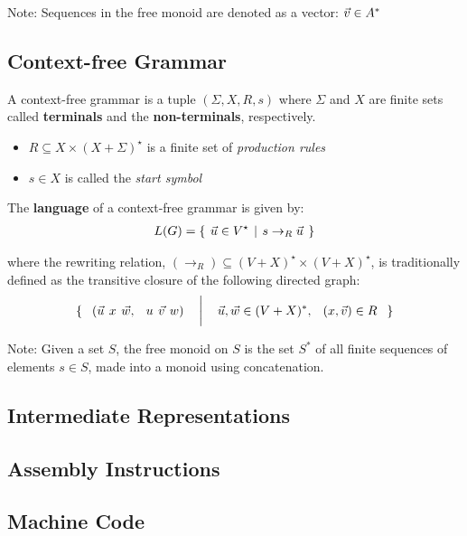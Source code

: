 Note: Sequences in the free monoid are denoted as a vector: $\large{\vec{v} \in A^{\ast}}$

\subsection{Context-free Grammar}
A context-free grammar is a tuple $(\Sigma, X, R, s)$ where $\Sigma$ and $X$ are finite sets called \textbf{terminals} 
and the \textbf{non-terminals}, respectively.

\begin{itemize}
    \item $R \subseteq X \times (X + \Sigma)^\star$ is a finite set of \textit{production rules} 
    \item $s \in X$ is called the \textit{start symbol}
\end{itemize}

The \textbf{language} of a context-free grammar is given by:
%
\begin{align}
\large{L(G) = \{\ \vec{u} \in V^\star\ \vert\ s \to_R \vec{u}\ \}}
\end{align}

where the rewriting relation, $(\to_R) \subseteq (V + X)^\star \times (V + X)^\star$, is traditionally defined as the transitive closure of the following directed graph:
%
\begin{align}
\large\{\ \ 
(\vec{u}{\ x\ }\vec{w},\ \ \vec{u\ v\ w})\quad 
\Big{\vert} \quad 
\vec{u}, \vec{w} \in (V+X)^{\ast},\ \ (x, \vec{v}) \in R\ \
\large\}
\end{align}

Note: Given a set $S$, the free monoid on $S$ is the set $S^{\ast}$ of all finite sequences of elements $s \in S$, made 
into a monoid using concatenation.


\subsection{Intermediate Representations}

\subsection{Assembly Instructions}

\subsection{Machine Code}
